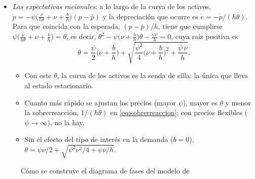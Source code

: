 \documentclass[11pt]{article}
\begin{document}
\begin{itemize}
\begin{itemize}
  \item \emph{paso 4, la senda de silla} (panel d):
    \begin{itemize}
    \item las flechas muestran que el sistema es un \emph{punto de silla}: en 2~de las regiones las flechas llevan hacia $A$ y en las otras 2~se alejan;
    \item solo una trayectoria, decreciente, llega a $A$: la senda de silla $SS$. Cualquier otra acaba alejándose sin límite (en discontinua), con una moneda que se deprecia o se aprecia sin fin, algo que unos agentes que miran hacia delante no esperarían;
    \item la senda de silla es la curva de los activos del texto, $e=\bar e-\frac{1}{h\theta}(p-\bar p)$, con el $\theta$ de las expectativas racionales.
    \end{itemize}
  \end{itemize}
\item \emph{Las expectativas racionales}: a lo largo de la curva de los activos, $\dot p=-\psi\big(\tfrac{\nu}{h\theta}+\nu+\tfrac{b}{h}\big)(p-\bar p)$ y la depreciación que ocurre es $\dot e=-\dot p/(h\theta)$. Para que coincida con la esperada, $(p-\bar p)/h$, tiene que cumplirse $\psi\big(\tfrac{\nu}{h\theta}+\nu+\tfrac{b}{h}\big)=\theta$, es decir, $\theta^2-\psi\big(\nu+\tfrac{b}{h}\big)\theta-\tfrac{\psi\nu}{h}=0$, cuya raíz positiva es
  \begin{equation}\label{eq:theta-racional}
  \theta=\frac{\psi}{2}\Big(\nu+\frac{b}{h}\Big)+\sqrt{\frac{\psi^2}{4}\Big(\nu+\frac{b}{h}\Big)^2+\frac{\psi\,\nu}{h}} .
  \end{equation}
  \begin{itemize}
  \item Con este $\theta$, la curva de los activos es la senda de silla: la única que lleva al estado estacionario.
  \item Cuanto más rápido se ajustan los precios (mayor $\psi$), mayor es $\theta$ y menor la sobrerreacción, $1/(h\theta)$ en \eqref{eq:sobrerreaccion}; con precios flexibles ($\psi\to\infty$), no la hay.
  \item Sin el efecto del tipo de interés en la demanda ($b=0$), $\theta=\psi\nu/2+\sqrt{\psi^2\nu^2/4+\psi\nu/h}$.
  \end{itemize}
\end{itemize}

\begin{figure}[H]
\centering
\caption{Cómo se construye el diagrama de fases del modelo de }\label{fig:dornbusch-fases-construccion}
\end{figure}
\end{document}
